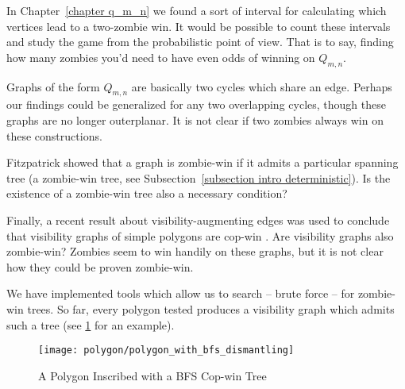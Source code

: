 In Chapter~\ref{chapter q_m_n} we found a sort of interval for calculating which vertices lead to a two-zombie win. It would be possible to count these intervals and study the game from the probabilistic point of view. That is to say, finding how many zombies you'd need to have even odds of winning on $Q_{m,n}$.

Graphs of the form $Q_{m,n}$ are basically two cycles which share an edge. Perhaps our findings could be generalized for any two overlapping cycles, though these graphs are no longer outerplanar. It is not clear if two zombies always win on these constructions.

Fitzpatrick showed that a graph is zombie-win if it admits a particular spanning tree (a zombie-win tree, see Subsection~\ref{subsection intro deterministic}). Is the existence of a zombie-win tree also a necessary condition?

Finally, a recent result about visibility-augmenting edges \cite{aichholzer2011convexifying} was used to conclude that visibility graphs of simple polygons are cop-win \cite{lubiw2017visibility}. Are visibility graphs also zombie-win? Zombies seem to win handily on these graphs, but it is not clear how they could be proven zombie-win.

We have implemented tools which allow us to search -- brute force -- for zombie-win trees. So far, every polygon tested produces a visibility graph which admits such a tree (see \ref{fig:polygon_with_bfs_dismantling} for an example).

\begin{figure}
  \centering
  \texttt{[image: polygon/polygon\_with\_bfs\_dismantling]}
  \caption{A Polygon Inscribed with a BFS Cop-win Tree \label{fig:polygon_with_bfs_dismantling}}
\end{figure}
